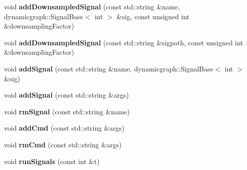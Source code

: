 \begin{DoxyCompactItemize}
\item 
\mbox{\label{classdynamic__graph_1_1PeriodicCall_af908eeabd002e24a5b4ae71de11128b2}} 
void {\bfseries add\+Downsampled\+Signal} (const std\+::string \&name, dynamicgraph\+::\+Signal\+Base$<$ int $>$ \&sig, const unsigned int \&downsampling\+Factor)
\item 
\mbox{\label{classdynamic__graph_1_1PeriodicCall_a6cb73bf041e6f3845510d89a13946247}} 
void {\bfseries add\+Downsampled\+Signal} (const std\+::string \&sigpath, const unsigned int \&downsampling\+Factor)
\item 
\mbox{\label{classdynamic__graph_1_1PeriodicCall_ad72e58ae9793d086627796954d1e6595}} 
void {\bfseries add\+Signal} (const std\+::string \&name, dynamicgraph\+::\+Signal\+Base$<$ int $>$ \&sig)
\item 
\mbox{\label{classdynamic__graph_1_1PeriodicCall_a77c491d9f263d6ff456c5cf9caa6fc2c}} 
void {\bfseries add\+Signal} (const std\+::string \&args)
\item 
\mbox{\label{classdynamic__graph_1_1PeriodicCall_aabe9a2c9977e494feefa7a193a1ec69c}} 
void {\bfseries rm\+Signal} (const std\+::string \&name)
\item 
\mbox{\label{classdynamic__graph_1_1PeriodicCall_abd5699b88a8780144d78dc8c7da2a891}} 
void {\bfseries add\+Cmd} (const std\+::string \&args)
\item 
\mbox{\label{classdynamic__graph_1_1PeriodicCall_a53295e7e1e701772d0adec765be0a2e3}} 
void {\bfseries rm\+Cmd} (const std\+::string \&args)
\item 
\mbox{\label{classdynamic__graph_1_1PeriodicCall_a843cd0c64ad8ba78597afd3aebe4dc8b}} 
void {\bfseries run\+Signals} (const int \&t)
\item 
\mbox{\label{classdynamic__graph_1_1PeriodicCall_a95a8524fcd1e2a0e8cfac030fcaa67e9}} 

\end{DoxyCompactItemize}
